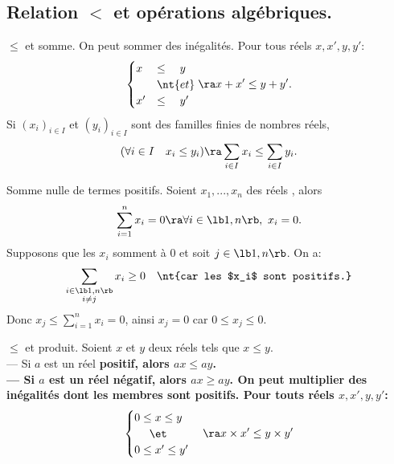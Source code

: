 \documentclass[11pt]{article}
\begin{document}
\subsection{Relation \texorpdfstring{$<$}{Lg} et opérations algébriques.}

\begin{rappel}{$\leq$ et somme.}{}
    On peut sommer des inégalités. Pour tous réels $x,x',y,y'$:
    \begin{equation*}
        \begin{cases}
            x &\leq \quad y\\
            &\nt{et}\\
            x' &\leq \quad y' 
        \end{cases} \ra x+x' \leq y+y'.
    \end{equation*}
    Si $(x_i)_{i\in I}$ et $(y_i)_{i\in I}$ sont des familles finies de nombres réels,
    \begin{equation*}
        (\forall i \in I \quad x_i \leq y_i) \ra \sum_{i\in I}x_i \leq \sum_{i\in I}y_i.
    \end{equation*}
\end{rappel}

\begin{prop}{Somme nulle de termes positifs.}{}
    Soient $x_1,...,x_n$ des réels , alors
    \begin{equation*}
        \sum_{i=1}^nx_i=0 \ra \forall i \in \lb 1,n \rb, ~ x_i=0.
    \end{equation*}
    \tcblower
    Supposons que les $x_i$ somment à 0 et soit $j\in\lb1,n\rb$. On a:
    \begin{equation*}
        \sum_{\substack{i\in\lb1,n\rb\\i\neq j}}x_i\geq 0 \quad \nt{car les $x_i$ sont positifs.}
    \end{equation*}
    Donc $x_j\leq\sum\limits_{i=1}^nx_i=0$, ainsi $x_j=0$ car $0\leq x_j \leq 0$.
\end{prop}

\begin{rappel}{$\leq$ et produit.}{}
    Soient $x$ et $y$ deux réels tels que $x\leq y$.\\
    --- Si $a$ est un réel \bf{positif}, alors $ax\leq ay$.\\
    --- Si $a$ est un réel \bf{négatif}, alors $ax\geq ay$.\n
    On peut multiplier des inégalités dont les membres sont \bf{positifs}. Pour touts réels $x,x',y,y'$:
    \begin{equation*}
        \begin{cases}
            0\leq x\leq y\\
            \quad~\et\\
            0\leq x'\leq y'
        \end{cases}\ra x\times x' \leq y\times y'
    \end{equation*}
\end{rappel}
\end{document}
